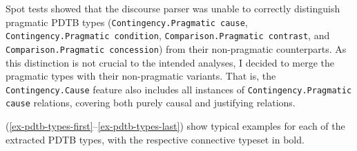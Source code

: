 \documentclass[
    a4paper,%
    12pt,%
    oneside,%
    toc=bibliography,
    final,
]{scrartcl}
\begin{document}

\begin{sloppypar}
Spot tests showed that the discourse parser was unable to correctly distinguish pragmatic PDTB types (\lstinline|Contingency.Pragmatic cause|, \lstinline|Contingency.Pragmatic condition|, \lstinline|Comparison.Pragmatic contrast|, and \lstinline|Comparison.Pragmatic concession|) from their non-pragmatic counterparts. As this distinction is not crucial to the intended analyses, I decided to merge the pragmatic types with their non-pragmatic variants. That is, the \lstinline|Contingency.Cause| feature also includes all instances of \lstinline|Contingency.Pragmatic cause| relations, covering both purely causal and justifying relations.
\end{sloppypar}

(\ref{ex-pdtb-types-first}–\ref{ex-pdtb-types-last}) show typical examples for each of the extracted PDTB types, with the respective connective typeset in bold.
\end{document}
